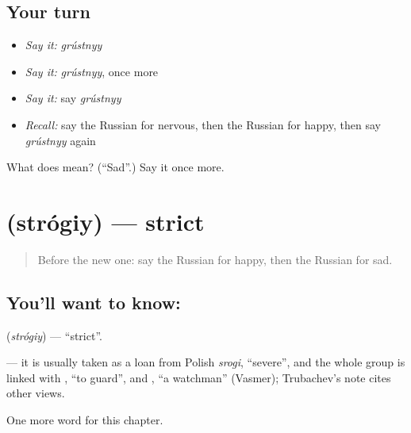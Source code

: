 \subsection*{Your turn}
\begin{itemize}
\raggedright
  \item \emph{Say it:} \emph{grústnyy}
  \item \emph{Say it:} \emph{grústnyy}, once more
  \item \emph{Say it:} say \emph{grústnyy}
  \item \emph{Recall:} say the Russian for nervous, then the Russian for happy, then say \emph{grústnyy} again
\end{itemize}

\begin{tcolorbox}[breakable,colback=teal!4,colframe=teal!35!black,title={Before you move on}]
What does  mean? (\textquotedblleft{}Sad\textquotedblright{}.) Say it once more.
\end{tcolorbox}
\section[\texorpdfstring{\ru{строгий} (strógiy)}{строгий (strógiy)}]{ (strógiy) — strict}

\label{lesson:RU-C216-strogiy}



\begin{quote}
Before the new one: say the Russian for happy, then the Russian for sad.
\end{quote}

\subsection*{You'll want to know: }
\textbf{} (\emph{strógiy}) — \textquotedblleft{}strict\textquotedblright{}.

\begin{cousinweb}
\textbf{} — it is usually taken as a loan from Polish \emph{srogi}, \textquotedblleft{}severe\textquotedblright{}, and the whole group is linked with \emph{}, \textquotedblleft{}to guard\textquotedblright{}, and \emph{}, \textquotedblleft{}a watchman\textquotedblright{} (Vasmer); Trubachev's note cites other views.
\end{cousinweb}

\begin{grammarlens}[title={What you've built}]
One more word for this chapter.
\end{grammarlens}


